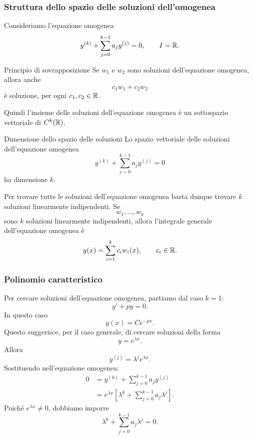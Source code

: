 \documentclass[a4paper]{article}
\begin{document}
\subsubsection{Struttura dello spazio delle soluzioni dell'omogenea}

\begin{radioactive}
Consideriamo l'equazione omogenea
\[
    y^{(k)}+\sum_{j=0}^{k-1}a_jy^{(j)}=0,
    \qquad I=\mathbb{R}.
\]
\end{radioactive}

\begin{radioactive}
\begin{snippetproposition}{Principio di sovrapposizione}
    Se \(w_1\) e \(w_2\) sono soluzioni dell'equazione omogenea, allora anche
    \[
        c_1w_1+c_2w_2
    \]
    è soluzione, per ogni \(c_1,c_2\in\mathbb{R}\).
\end{snippetproposition}
\end{radioactive}

\begin{radioactive}
Quindi l'insieme delle soluzioni dell'equazione omogenea è un sottospazio vettoriale di \(C^k(\mathbb{R})\).
\end{radioactive}

\begin{radioactive}
\begin{snippettheorem}{Dimensione dello spazio delle soluzioni}
    Lo spazio vettoriale delle soluzioni dell'equazione omogenea
    \[
        y^{(k)}+\sum_{j=0}^{k-1}a_jy^{(j)}=0
    \]
    ha dimensione \(k\).
\end{snippettheorem}
\end{radioactive}

\begin{radioactive}
Per trovare tutte le soluzioni dell'equazione omogenea basta dunque trovare \(k\) soluzioni linearmente indipendenti. Se
\[
    w_1,\ldots,w_k
\]
sono \(k\) soluzioni linearmente indipendenti, allora l'integrale generale dell'equazione omogenea è
\[
    y(x)=\sum_{i=1}^{k}c_iw_i(x),
    \qquad c_i\in\mathbb{R}.
\]
\end{radioactive}

\subsubsection{Polinomio caratteristico}

\begin{radioactive}
Per cercare soluzioni dell'equazione omogenea, partiamo dal caso \(k=1\):
\[
    y'+py=0.
\]
In questo caso
\[
    y(x)=Ce^{-px}.
\]
Questo suggerisce, per il caso generale, di cercare soluzioni della forma
\[
    y=e^{\lambda x}.
\]
Allora
\[
    y^{(j)}=\lambda^j e^{\lambda x}.
\]
Sostituendo nell'equazione omogenea:
\begin{align*}
    0
    &=
    y^{(k)}+\sum_{j=0}^{k-1}a_jy^{(j)}\\
    &=
    e^{\lambda x}
    \left[
        \lambda^k+\sum_{j=0}^{k-1}a_j\lambda^j
    \right].
\end{align*}
Poiché \(e^{\lambda x}\neq 0\), dobbiamo imporre
\[
    \lambda^k+\sum_{j=0}^{k-1}a_j\lambda^j=0.
\]
\end{radioactive}
\end{document}
